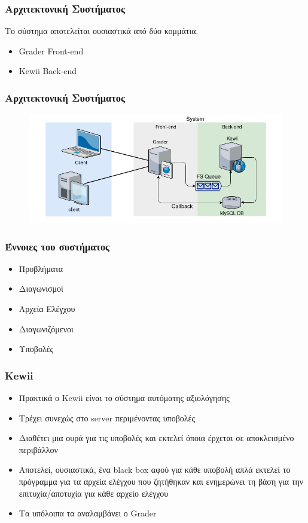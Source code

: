 \documentclass{beamer}
\begin{document}
\begin{frame}
  \frametitle{Αρχιτεκτονική Συστήματος}

  Το σύστημα αποτελείται ουσιαστικά από δύο κομμάτια.

  \begin{itemize}
      \item Grader Front-end
      \item Kewii Back-end
  \end{itemize}

\end{frame}

\begin{frame}
  \frametitle{Αρχιτεκτονική Συστήματος}

  \begin{figure}
    \includegraphics[scale=0.3]{../Figures/graderarchitecture.png}
  \end{figure}
\end{frame}

\begin{frame}
  \frametitle{Έννοιες του συστήματος}

  \begin{itemize}
      \item Προβλήματα
      \item Διαγωνισμοί
      \item Αρχεία Ελέγχου
      \item Διαγωνιζόμενοι
      \item Υποβολές
  \end{itemize}

\end{frame}

\begin{frame}
  \frametitle{Kewii}

  \begin{itemize}
      \item Πρακτικά ο Kewii είναι το σύστημα αυτόματης αξιολόγησης
      \item Τρέχει συνεχώς στο server περιμένοντας υποβολές
      \item Διαθέτει μια ουρά για τις υποβολές και εκτελεί όποια έρχεται σε
        αποκλεισμένο περιβάλλον
      \item Αποτελεί, ουσιαστικά, ένα black box αφού για κάθε υποβολή απλά εκτελεί
        το πρόγραμμα για τα αρχεία ελέγχου που ζητήθηκαν και ενημερώνει τη βάση για
        την επιτυχία/αποτυχία για κάθε αρχείο ελέγχου
      \item Τα υπόλοιπα τα αναλαμβάνει ο Grader
  \end{itemize}
\end{frame}
\end{document}
